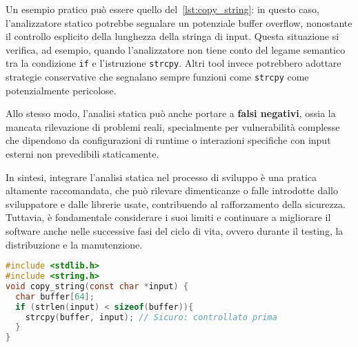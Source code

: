 Un esempio pratico può essere quello del~\autoref{lst:copy_string}: in questo caso,
l'analizzatore statico potrebbe segnalare un potenziale buffer overflow, nonostante
il controllo esplicito della lunghezza della stringa di input. Questa situazione
si verifica, ad esempio, quando l'analizzatore non tiene conto del legame
semantico tra la condizione \texttt{if} e l'istruzione \texttt{strcpy}. Altri tool
invece potrebbero adottare strategie conservative che segnalano sempre funzioni come
\texttt{strcpy} come potenzialmente pericolose.

Allo stesso modo, l'analisi statica può anche portare a \textbf{falsi negativi},
ossia la mancata rilevazione di problemi reali, specialmente per vulnerabilità
complesse che dipendono da configurazioni di runtime o interazioni specifiche
con input esterni non prevedibili staticamente.

In sintesi, integrare l'analisi statica nel processo di sviluppo è una pratica altamente
raccomandata, che può rilevare dimenticanze o falle introdotte dallo
sviluppatore e dalle librerie usate, contribuendo al rafforzamento della sicurezza.
Tuttavia, è fondamentale considerare i suoi limiti e continuare a migliorare il software
anche nelle successive fasi del ciclo di vita, ovvero durante il testing, la distribuzione
e la manutenzione.

\bigskip
\begin{lstlisting}[language=C, caption={Copia sicura di una stringa con \texttt{strcpy()}}, label={lst:copy_string}]
#include <stdlib.h>
#include <string.h>
void copy_string(const char *input) {
  char buffer[64];
  if (strlen(input) < sizeof(buffer)){
    strcpy(buffer, input); // Sicuro: controllato prima
  }
}
\end{lstlisting}